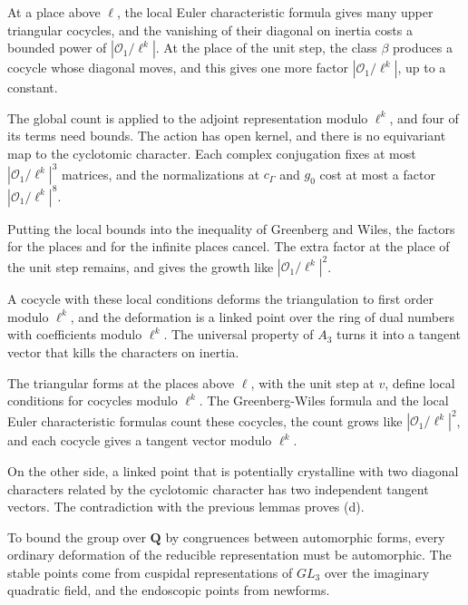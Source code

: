At a place above $\ell$, the local Euler characteristic formula gives many upper triangular cocycles, and the vanishing of their diagonal on inertia costs a bounded power of $|\mathcal O_1/\ell^k|$. At the place of the unit step, the class $\beta$ produces a cocycle whose diagonal moves, and this gives one more factor $|\mathcal O_1/\ell^k|$, up to a constant.

The global count is applied to the adjoint representation modulo $\ell^k$, and four of its terms need bounds. The action has open kernel, and there is no equivariant map to the cyclotomic character. Each complex conjugation fixes at most $|\mathcal O_1/\ell^k|^3$ matrices, and the normalizations at $c_\Gamma$ and $g_0$ cost at most a factor $|\mathcal O_1/\ell^k|^8$.

Putting the local bounds into the inequality of Greenberg and Wiles, the factors for the places and for the infinite places cancel. The extra factor at the place of the unit step remains, and gives the growth like $|\mathcal O_1/\ell^k|^2$.

A cocycle with these local conditions deforms the triangulation to first order modulo $\ell^k$, and the deformation is a linked point over the ring of dual numbers with coefficients modulo $\ell^k$. The universal property of $A_3$ turns it into a tangent vector that kills the characters on inertia.

The triangular forms at the places above $\ell$, with the unit step at $v$, define local conditions for cocycles modulo $\ell^k$. The Greenberg-Wiles formula and the local Euler characteristic formulas count these cocycles, the count grows like $|\mathcal O_1/\ell^k|^2$, and each cocycle gives a tangent vector modulo $\ell^k$.

On the other side, a linked point that is potentially crystalline with two diagonal characters related by the cyclotomic character has two independent tangent vectors. The contradiction with the previous lemmas proves (d).

To bound the group over $\mathbf Q$ by congruences between automorphic forms, every ordinary deformation of the reducible representation must be automorphic. The stable points come from cuspidal representations of $GL_3$ over the imaginary quadratic field, and the endoscopic points from newforms.

